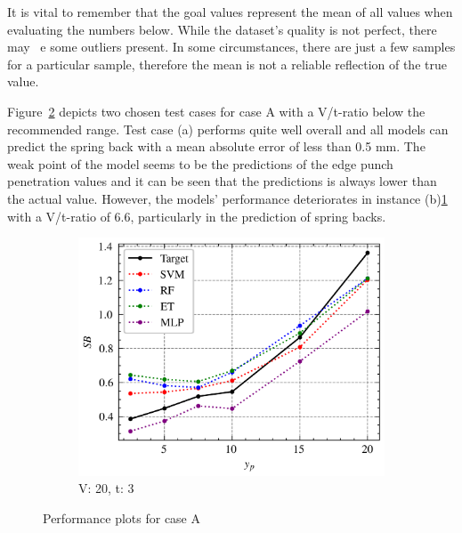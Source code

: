 It is vital to remember that the goal values represent the mean of all values when evaluating the numbers below.
While the dataset's quality is not perfect, there may \ e some outliers present.
In some circumstances, there are just a few samples for a particular sample, therefore the mean is not a reliable
reflection of the true value.


Figure~\ref{fig:performance-case-a} depicts two chosen test cases for case A with a V/t-ratio below the recommended
range.
Test case (a) performs quite well overall and all models can predict the spring back with a mean absolute error of
less than 0.5 mm.
The weak point of the model seems to be the predictions of the edge punch penetration values and it can be seen that
the predictions is always lower than the actual value.
However, the models' performance deteriorates in instance (b)\ref{fig:performance-20-3.0} with a V/t-ratio of 6.6,
particularly in the prediction of spring backs.

\begin{figure}[h]
    \begin{tcolorbox}[arc=0pt,boxrule=0.5pt]
        \hfill
        \begin{subfigure}{0.5\textwidth}
            \includegraphics[width=\textwidth]{chap5/images/performance_20_3.0}
            \caption{V: 20, t: 3}
            \label{fig:performance-20-3.0}
        \end{subfigure}
    \end{tcolorbox}
    \caption{Performance plots for case A}
    \label{fig:performance-case-a}
\end{figure}

